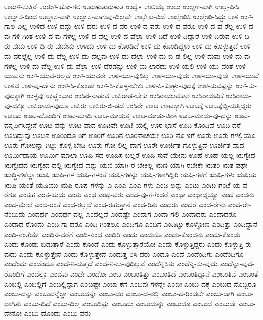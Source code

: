 {ಉರುಳಿ-ಸುತ್ತಿರೆ
ಉರುಳಿ-ಹೋ-ಗಲಿ
ಉರುಳುತುರುಳುತ
ಉರ್ಧ್ವ
ಉಲಿಯೈ
ಉಲು
ಉಲ್ಬಣ-ವಾಗಿ
ಉಲ್ಲ-ಘಿಸಿ
ಉಲ್ಲಾಸ-ದಿಂದ
ಉಲ್ಲಾಸ-ವಾಗಿ
ಉಲ್ಲಾಸ-ವಾಗುವು-ದಿಲ್ಲವೇ
ಉಲ್ಲೇಖ-ವಿದೆ
ಉಲ್ಲೇಖಿಸಿ
ಉಲ್ಲೇಖಿ-ಸಿದ್ದು
ಉಳಿ
ಉಳಿ-ಗಾಲ-ವಿಲ್ಲ
ಉಳಿದ
ಉಳಿ-ದದ್ದು
ಉಳಿ-ದರು
ಉಳಿ-ದ-ವರ
ಉಳಿ-ದ-ವರು
ಉಳಿ-ದ-ವರೂ
ಉಳಿ-ದ-ವ-ರೆಲ್ಲ
ಉಳಿ-ದ-ವು-ಗಳಿ-ಗಿಂತ
ಉಳಿ-ದ-ವು-ಗಳೆಲ್ಲ
ಉಳಿ-ದ-ವೆಲ್ಲ
ಉಳಿ-ದ-ವೆಲ್ಲಾ
ಉಳಿ-ದಿದೆ
ಉಳಿ-ದಿದ್ದಾರೆ
ಉಳಿ-ದಿರುವ
ಉಳಿ-ದಿ-ರು-ವುದು
ಉಳಿ-ದಿ-ರು-ವುದೇನು
ಉಳಿದು
ಉಳಿ-ದು-ಕೊಂಡಿದೆ
ಉಳಿ-ದು-ಕೊಂಡಿದ್ದಳು
ಉಳಿ-ದು-ಕೊಳ್ಳುತ್ತದೆ
ಉಳಿ-ದು-ದರಲ್ಲೆಲ್ಲ
ಉಳಿ-ದು-ದೆಲ್ಲ
ಉಳಿ-ದು-ದೆಲ್ಲವು
ಉಳಿ-ದು-ದೆಲ್ಲಾ
ಉಳಿ-ದು-ಬಿ-ಡ-ಲಿಲ್ಲ
ಉಳಿ-ದುವು
ಉಳಿ-ದು-ವು-ಗಳೆಲ್ಲ
ಉಳಿ-ದು-ವೆಲ್ಲ
ಉಳಿ-ದು-ವೆಲ್ಲಾ
ಉಳಿ-ದೆರಡನ್ನು
ಉಳಿ-ಯ-ಲಾರದು
ಉಳಿ-ಯಲಿ
ಉಳಿ-ಯು-ವಂತೆ
ಉಳಿ-ಯುವನು
ಉಳಿ-ಯುವ-ರಲ್ಲವೆ
ಉಳಿ-ಯುವರೇ
ಉಳಿ-ಯು-ವುದಿಲ್ಲ
ಉಳಿ-ಯು-ವುದು
ಉಳಿ-ಯು-ವುದೇ
ಉಳಿ-ಯುವೆ
ಉಳಿವ
ಉಳಿ-ವು-ದೇನು
ಉಳಿ-ಸಿ-ಕೊಂಡು
ಉಳಿ-ಸಿ-ಕೊಳ್ಳ-ಬೇಕು
ಉಳಿ-ಸಿ-ಕೊಳ್ಳು-ವುದಕ್ಕೆ
ಉಳಿ-ಸುವಷ್ಟನ್ನು
ಉಳಿ-ಸು-ವುದಕ್ಕಾಗಿ
ಉಳ್ಳವು
ಉಷ್ಣಂಭಾರ
ಉಸಿರ-ನಾಡುವ
ಉಸಿರಾಡ-ಬೇಕು
ಉಸಿರಾಡಲವಕಾಶ
ಉಸಿರಾಡುವಿಕೆ
ಉಸಿರಾಡು-ವು-ದಕ್ಕೂ
ಉಸಿರಾಡು-ವುದೂ
ಉಸಿರು
ಉಸಿರು-ಬಿ-ಡದೆ
ಉಸಿರೇ
ಊಟ
ಊಟಕ್ಕಾಗಿ
ಊಟಕ್ಕೆ
ಊಟಕ್ಕೆಬ್ಬಿ-ಸುತ್ತಿದ್ದರು
ಊಟದ
ಊಟ-ದೊಂದಿಗೆ
ಊಟ-ಮಾಡಿ
ಊಟ-ಮಾಡುತ್ತ
ಊಟ-ಮಾಡು-ವಿರಾ
ಊಟ-ಮಾಡು-ವು-ದನ್ನು
ಊಟ-ವನ್ನರ್ಪಿಸಿದ್ದೇನೆ
ಊಟ-ವನ್ನು
ಊಟ-ವಾದ
ಊಟವೇ
ಊಟಿ-ಯಲ್ಲಿ
ಊಠ-ಭಾಸೆ
ಊದಿ-ಕೊಂಡಿವೆ
ಊದಿ-ದರೆ
ಊದಿದ್ದುವು
ಊದಿನ
ಊರಿಂದೂ-ರಿಗೆ
ಊರಿಗೆ
ಊರಿನ
ಊರಿನಾಚೆಯೇ
ಊರಿ-ನೊ-ಳಗೆ
ಊರು
ಊರು-ಗಳಲ್ಲಿಯೂ
ಊರು-ಗೋಲನ್ನಾ-ಗಿಟ್ಟು-ಕೊಳ್ಳ-ಬೇಡಿ
ಊರು-ಗೋ-ಲಿಲ್ಲ-ದಾಗ
ಊರೇ
ಊರ್ಜಿತ-ಗೊಳ್ಳುತ್ತಿದೆ
ಊರ್ಜಿತ-ವಾದ
ಊರ್ಮಿದಾಯ
ಊರ್ಮಿ-ಮಾಲಾ
ಊಹಿ-ಸದ
ಊಹಿಸ-ಬಲ್ಲರೆ
ಊಹಿ-ಸುವೆ-ಯೇನು
ಊಹೆ
ಊಹೆ-ಯಲ್ಲ
ಋಗ್ವೇದ
ಋಗ್ವೇದದ
ಋಗ್ವೇದ-ದಲ್ಲಿ
ಋಗ್ವೇದ-ವನ್ನು
ಋಣಿ-ಯಾಗಿ-ರ-ಬೇಕಿಲ್ಲ
ಋಣಿ-ಯಾಗಿ-ರಬೇಕೇ
ಋತಂ
ಋತ-ಪಥೇ
ಋದ್ಧಿ-ಗಳೆಲ್ಲಾ
ಋಷಿ
ಋಷಿ-ಗಳ
ಋಷಿ-ಗಳಂತೆ
ಋಷಿ-ಗಳನ್ನು
ಋಷಿ-ಗಳಾಗಿದ್ದಿರಿ
ಋಷಿ-ಗಳಿಗೆ
ಋಷಿ-ಗಳು
ಋಷಿಯ
ಋಷಿ-ಯಂತೆ
ಋಷಿಯು
ಋಷಿ-ರೂಪ-ಗಳನ್ನು
ಎ
ಎಂಎ
ಎಂಎ-ಗಳು
ಎಂಜ-ಲನ್ನು
ಎಂಟು
ಎಂಟು-ಗಂಟೆ-ಯ-ವ-ರೆಗೂ
ಎಂತಹ
ಎಂತ-ಹುದು
ಎಂತು
ಎಂಥ
ಎಂಥ-ವರು
ಎಂಥ-ವು-ಗಳೆಂದರೆ
ಎಂಥಾ
ಎಂಥಾದ್ದಯ್ಯಾ
ಎಂದ
ಎಂದನು
ಎಂದ-ಮೇಲೆ
ಎಂದ-ರಂತೆ
ಎಂದ-ರಲ್ಲದೆ
ಎಂದ-ರಹುತ್ತಾನೆ
ಎಂದ-ರಿತು
ಎಂದರು
ಎಂದರೆ
ಎಂದ-ರೇನು
ಎಂದ-ರೇ-ನೆಂಬುದು
ಎಂದರ್ಥ
ಎಂದರ್ಥ-ವಲ್ಲ
ಎಂದಲ್ಲವೆ
ಎಂದಷ್ಟೇ
ಎಂದಾಗ
ಎಂದಾ-ಗಲಿ
ಎಂದಾದರು
ಎಂದಾದರೂ
ಎಂದಾದ-ರೊಂದು
ಎಂದಿ-ಗಾ-ದರೂ
ಎಂದಿ-ಗಿಂತಲೂ
ಎಂದಿಗೂ
ಎಂದಿಗೆ
ಎಂದಿಟ್ಟು-ಕೊಳ್ಳೋಣ
ಎಂದಿತ್ತು
ಎಂದಿದ್ದಾನೆ
ಎಂದಿ-ನಂತೆಯೇ
ಎಂದಿನ-ವರೆಗೆ
ಎಂದಿ-ನಿಂದ
ಎಂದಿರಿ
ಎಂದು
ಎಂದುಕೊ
ಎಂದು-ಕೊಂಡನು
ಎಂದು-ಕೊಂಡು
ಎಂದು-ಕೊಂಡು-ಬಿಡುತ್ತಾರೆ
ಎಂದು-ಕೊಂಡೆ
ಎಂದು-ಕೊಳ್ಳುತ್ತಾರೆಯೋ
ಎಂದು-ಕೊಳ್ಳುತ್ತಿದ್ದರು
ಎಂದು-ಕೊಳ್ಳುತ್ತಿ-ರು-ವುದು
ಎಂದು-ಕೊಳ್ಳುತ್ತೇನೆ
ಎಂದು-ಕೊಳ್ಳುತ್ತೇವೆ
ಎಂದುತ್ತ-ರಿಸಿ-ದರು
ಎಂದೂ
ಎಂದೆ
ಎಂದೆಂದಿಗು
ಎಂದೆಂದಿಗೂ
ಎಂದೆಂದು
ಎಂದೆಂದೂ
ಎಂದೆ-ನಿ-ಸುತ್ತದೆ
ಎಂದೆ-ನಿ-ಸು-ವುದಿಲ್ಲವೆ
ಎಂದೆನ್ನಿಸಿತು
ಎಂದೆನ್ನಿ-ಸು-ವುದು
ಎಂದೆನ್ನು-ವುದ-ರೊಂದಿಗೆ
ಎಂದೆಲ್ಲಾ
ಎಂದೆವು
ಎಂದೇ
ಎಂದೋ
ಎಂಬ
ಎಂಬಂತಿತ್ತು
ಎಂಬಂತಿದೆ
ಎಂಬಂತಿದ್ದಾನೆ
ಎಂಬಂತಿವೆ
ಎಂಬಂತೆ
ಎಂಬಲ್ಲಿ
ಎಂಬಲ್ಲಿಗೆ
ಎಂಬಲ್ಲಿದ್ದಾಗ
ಎಂಬಷ್ಟೇ
ಎಂಬಾ-ಕೆಗೆ
ಎಂಬಿವು-ಗಳನ್ನೇ
ಎಂಬೀ
ಎಂಬು-ದಕ್ಕೆ
ಎಂಬುದ-ನೊಬ್ಬರೂ
ಎಂಬು-ದನ್ನು
ಎಂಬುದನ್ನೆಲ್ಲಾ
ಎಂಬುದನ್ನೇ
ಎಂಬು-ದರ
ಎಂಬು-ದ-ರಲ್ಲಿ
ಎಂಬು-ದ-ರಿಂದಲೇ
ಎಂಬು-ದಾಗಿ
ಎಂಬು-ದಾಗಿತ್ತು
ಎಂಬು-ದಿದೆ
ಎಂಬು-ದಿಲ್ಲ
ಎಂಬುದಿಷ್ಟು
ಎಂಬುದು
ಎಂಬುದುನ್ನು
ಎಂಬುದೂ
ಎಂಬುದೆ
ಎಂಬುದೇ
ಎಂಬು-ದೇನೋ
ಎಂಬು-ದೊಂದು
ಎಂಬು-ವನು
}
